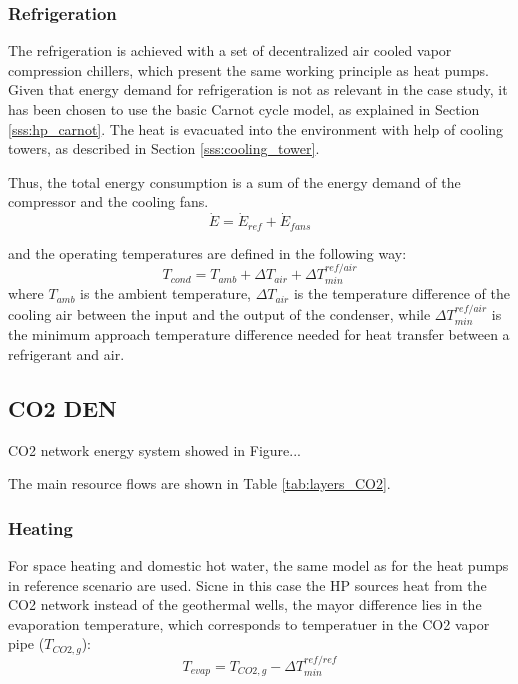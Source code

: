 \documentclass{article}
\begin{document}
\subsubsection{Refrigeration}
The refrigeration is achieved with a set of decentralized air cooled vapor compression chillers, which present the same working principle as heat pumps. Given that energy demand for refrigeration is not as relevant in the case study, it has been chosen to use the basic Carnot cycle model, as explained in Section \ref{sss:hp_carnot}. The heat is evacuated into the environment with help of cooling towers, as described in Section \ref{sss:cooling_tower}.

Thus, the total energy consumption is a sum of the energy demand of the compressor and the cooling fans.
\begin{equation}
\dot{E} = \dot{E}_{ref} + \dot{E}_{fans}
\end{equation}

and the operating temperatures are defined in the following way:
\begin{equation}
    T_{cond} = T_{amb} + \Delta T_{air} + \Delta T_{min}^{ref/air}
\end{equation}
where $T_{amb}$ is the ambient temperature, $\Delta T_{air}$ is the temperature difference of the cooling air between the input and the output of the condenser, while $\Delta T_{min}^{ref/air}$ is the minimum approach temperature difference needed for heat transfer between a refrigerant and air.\\

\subsection{CO2 DEN}
CO2 network energy system showed in Figure...

The main resource flows are shown in Table \ref{tab:layers_CO2}.


\subsubsection{Heating}
For space heating and domestic hot water, the same model as for the heat pumps in reference scenario are used. Sicne in this case the HP sources heat from the CO2 network instead of the geothermal wells, the mayor difference lies in the evaporation temperature, which corresponds to temperatuer in the CO2 vapor pipe ($T_{CO2,g}$):
\begin{equation}
    T_{evap} = T_{CO2,g} - \Delta T_{min}^{ref/ref}
\end{equation}
\end{document}
